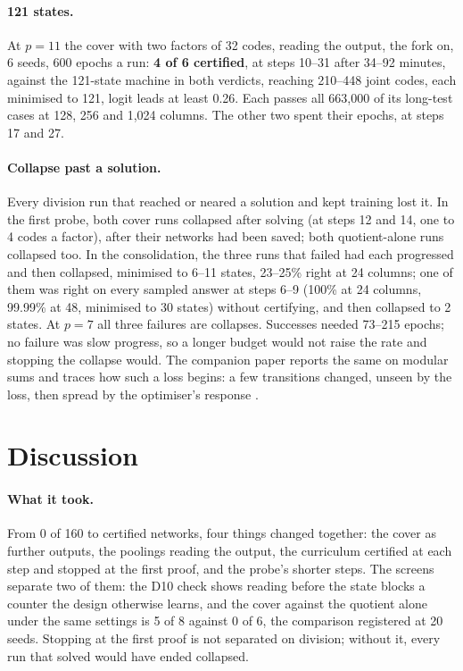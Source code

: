 \documentclass[11pt]{article}
\begin{document}
\paragraph{121 states.} At $p = 11$ the cover with two factors of 32 codes, reading the output,
the fork on, 6 seeds, 600 epochs a run: \textbf{4 of 6 certified}, at steps 10--31 after 34--92
minutes, against the 121-state machine in both verdicts, reaching 210--448 joint codes, each
minimised to 121, logit leads at least 0.26. Each passes all 663{,}000 of its long-test cases at
128, 256 and 1{,}024 columns. The other two spent their epochs, at steps 17 and 27.

\paragraph{Collapse past a solution.} Every division run that reached or neared a solution and kept training lost it. In the first probe,
both cover runs collapsed after solving (at steps 12 and 14, one to 4 codes a factor), after their
networks had been saved; both quotient-alone runs collapsed too. In the consolidation, the three runs that
failed had each progressed and then collapsed, minimised to 6--11 states, 23--25\% right at 24
columns; one of them was right on every sampled answer at steps 6--9 (100\% at 24 columns, 99.99\%
at 48, minimised to 30 states) without certifying, and then collapsed to 2 states. At $p = 7$ all three
failures are collapses. Successes needed 73--215 epochs; no failure was slow progress, so a longer
budget would not raise the rate and stopping the collapse would. The companion paper reports the same on
modular sums and traces how such a loss begins: a few transitions changed, unseen by the loss, then
spread by the optimiser's response \citep{barkhuizen-2026-snapped-window-recurrence}.


\section{Discussion}

\paragraph{What it took.} From 0 of 160 to certified networks, four things changed together: the
cover as further outputs, the poolings reading the output, the curriculum certified at each step and
stopped at the first proof, and the probe's shorter steps. The screens separate two of them: the
D10 check shows reading before the state blocks a counter the design otherwise learns, and the
cover against the quotient alone under the same settings is 5 of 8 against 0 of 6, the comparison
registered at 20 seeds. Stopping at the first proof is not separated on division; without it, every
run that solved would have ended collapsed.
\end{document}
